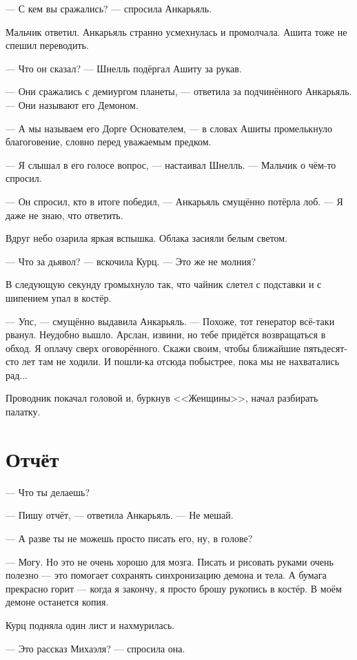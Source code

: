 \documentclass[a4paper,10pt,fleqn]{book}\usepackage{polyglossia}\setdefaultlanguage{english}\setotherlanguage{russian}\defaultfontfeatures{Ligatures=TeX,Mapping=tex-text}\usepackage{xcolor}\definecolor{lightgray}{HTML}{bbbbbb}\color{lightgray}\newcommand{\ml}[3]{\textcolor{black}{#3}}
\begin{document}
--- С кем вы сражались? --- спросила Анкарьяль.

Мальчик ответил.
Анкарьяль странно усмехнулась и промолчала.
Ашита тоже не спешил переводить.

--- Что он сказал? --- Шнелль подёргал Ашиту за рукав.

--- Они сражались с демиургом планеты, --- ответила за подчинённого Анкарьяль.
--- Они называют его Демоном.

--- А мы называем его Дорге Основателем, --- в словах Ашиты промелькнуло благоговение, словно перед уважаемым предком.

--- Я слышал в его голосе вопрос, --- настаивал Шнелль.
--- Мальчик о чём-то спросил.

--- Он спросил, кто в итоге победил, --- Анкарьяль смущённо потёрла лоб.
--- Я даже не знаю, что ответить.

Вдруг небо озарила яркая вспышка.
Облака засияли белым светом.

--- Что за дьявол? --- вскочила Курц.
--- Это же не молния?

В следующую секунду громыхнуло так, что чайник слетел с подставки и с шипением упал в костёр.

--- Упс, --- смущённо выдавила Анкарьяль.
--- Похоже, тот генератор всё-таки рванул.
Неудобно вышло.
Арслан, извини, но тебе придётся возвращаться в обход.
Я оплачу сверх оговорённого.
Скажи своим, чтобы ближайшие пятьдесят-сто лет там не ходили.
И пошли-ка отсюда побыстрее, пока мы не нахватались рад...

Проводник покачал головой и, буркнув <<Женщины>>, начал разбирать палатку.

\section{Отчёт}

--- Что ты делаешь?

--- Пишу отчёт, --- ответила Анкарьяль.
--- Не мешай.

--- А разве ты не можешь просто писать его, ну, в голове?

--- Могу.
Но это не очень хорошо для мозга.
Писать и рисовать руками очень полезно --- это помогает сохранять синхронизацию демона и тела.
А бумага прекрасно горит --- когда я закончу, я просто брошу рукопись в костёр.
В моём демоне останется копия.

Курц подняла один лист и нахмурилась.

--- Это рассказ Михаэля? --- спросила она.
\end{document}
